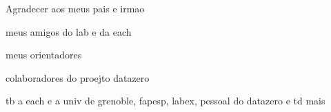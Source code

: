 
Agradecer aos meus pais e irmao

meus amigos do lab e da each

meus orientadores

colaboradores do proejto datazero


tb a each e a univ de grenoble, fapesp, labex, pessoal do datazero e td mais



